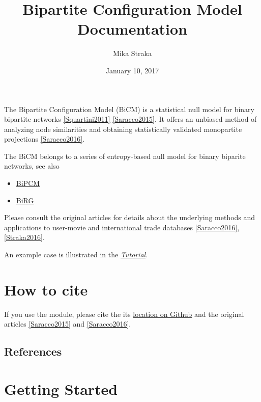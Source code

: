 \documentclass[letterpaper,10pt,english]{sphinxmanual}
\title{Bipartite Configuration Model Documentation}
\date{January 10, 2017}
\author{Mika Straka}
\begin{document}
\maketitle
\tableofcontents
{}\label{index::doc}


The Bipartite Configuration Model (BiCM) is a statistical null model for binary
bipartite networks {\hyperref[index:squartini2011]{{[}Squartini2011{]}}} {\hyperref[index:saracco2015]{{[}Saracco2015{]}}}. It offers an unbiased method of analyzing node
similarities and obtaining statistically validated monopartite projections
{\hyperref[index:saracco2016]{{[}Saracco2016{]}}}.

The BiCM belongs to a series of entropy-based null model for binary biparite
networks, see also
\begin{itemize}
\item {} 
\href{https://github.com/tsakim/bipcm}{BiPCM}

\item {} 
\href{https://github.com/tsakim/birg}{BiRG}

\end{itemize}

Please consult the original articles for details about the underlying methods
and applications to user-movie and international trade databases
{\hyperref[index:saracco2016]{{[}Saracco2016{]}}}, {\hyperref[index:straka2016]{{[}Straka2016{]}}}.

An example case is illustrated in the {\hyperref[source/tutorial:tutorial]{\emph{Tutorial}}}.


\chapter{How to cite}
\label{index:bipartite-configuration-model-documentation}\label{index:how-to-cite}
If you use the  module, please cite the its \href{https://github.com/tsakim/bicm}{location on Github} and the original articles {\hyperref[index:saracco2015]{{[}Saracco2015{]}}} and
{\hyperref[index:saracco2016]{{[}Saracco2016{]}}}.


\section{References}
\label{index:references}

\chapter{Getting Started}
\label{index:getting-started}
\end{document}
